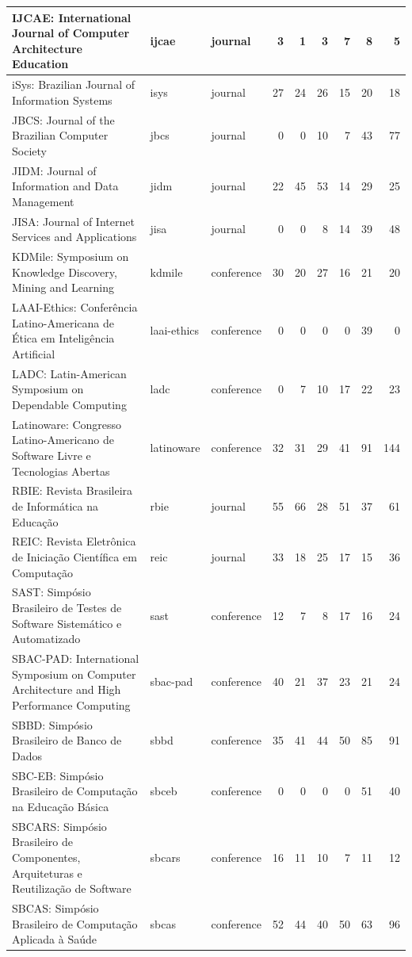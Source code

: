 \begin{table}[H]
\begin{tabular}{|p{10cm}|l|l|r|r|r|r|r|r|}
\hline
IJCAE: International Journal of Computer Architecture Education & ijcae & journal & 3 & 1 & 3 & 7 & 8 & 5 \\
\hline
iSys: Brazilian Journal of Information Systems & isys & journal & 27 & 24 & 26 & 15 & 20 & 18 \\
\hline
JBCS: Journal of the Brazilian Computer Society & jbcs & journal & 0 & 0 & 10 & 7 & 43 & 77 \\
\hline
JIDM: Journal of Information and Data Management & jidm & journal & 22 & 45 & 53 & 14 & 29 & 25 \\
\hline
JISA: Journal of Internet Services and Applications & jisa & journal & 0 & 0 & 8 & 14 & 39 & 48 \\
\hline
KDMile: Symposium on Knowledge Discovery, Mining and Learning & kdmile & conference & 30 & 20 & 27 & 16 & 21 & 20 \\
\hline
LAAI-Ethics: Conferência Latino-Americana de Ética em Inteligência Artificial & laai-ethics & conference & 0 & 0 & 0 & 0 & 39 & 0 \\
\hline
LADC: Latin-American Symposium on Dependable Computing & ladc & conference & 0 & 7 & 10 & 17 & 22 & 23 \\
\hline
Latinoware: Congresso Latino-Americano de Software Livre e Tecnologias Abertas & latinoware & conference & 32 & 31 & 29 & 41 & 91 & 144 \\
\hline
RBIE: Revista Brasileira de Informática na Educação & rbie & journal & 55 & 66 & 28 & 51 & 37 & 61 \\
\hline
REIC: Revista Eletrônica de Iniciação Científica em Computação & reic & journal & 33 & 18 & 25 & 17 & 15 & 36 \\
\hline
SAST: Simpósio Brasileiro de Testes de Software Sistemático e Automatizado & sast & conference & 12 & 7 & 8 & 17 & 16 & 24 \\
\hline
SBAC-PAD: International Symposium on Computer Architecture and High Performance Computing & sbac-pad & conference & 40 & 21 & 37 & 23 & 21 & 24 \\
\hline
SBBD: Simpósio Brasileiro de Banco de Dados & sbbd & conference & 35 & 41 & 44 & 50 & 85 & 91 \\
\hline
SBC-EB: Simpósio Brasileiro de Computação na Educação Básica & sbceb & conference & 0 & 0 & 0 & 0 & 51 & 40 \\
\hline
SBCARS: Simpósio Brasileiro de Componentes, Arquiteturas e Reutilização de Software & sbcars & conference & 16 & 11 & 10 & 7 & 11 & 12 \\
\hline
SBCAS: Simpósio Brasileiro de Computação Aplicada à Saúde & sbcas & conference & 52 & 44 & 40 & 50 & 63 & 96 \\

\end{tabular}
\end{table}
